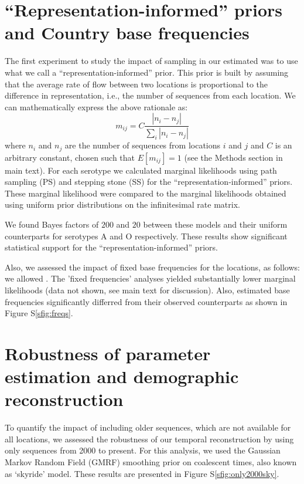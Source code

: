 \documentclass[a4paper,10pt]{article}
\begin{document}
\section{``Representation-informed'' priors and Country base frequencies}
The first experiment to study the impact of sampling in our estimated was to use what we call a ``representation-informed'' prior.
This prior is built by assuming that the average rate of flow between two locations is proportional to the difference in representation, i.e., the number of sequences from each location.
We can mathematically express the above rationale as:
\begin{equation}
 m_{ij}=C\frac{|n_i-n_j|}{\sum_i|n_i-n_j|}
\end{equation}
where $n_i$ and $n_j$ are the number of sequences from locations $i$ and $j$ and $C$ is an arbitrary constant, chosen such that $E[m_{ij}]=1$ (see the Methods section in main text).
For each serotype we calculated marginal likelihoods using path sampling (PS) and stepping stone (SS) for the ``representation-informed'' priors.
These marginal likelihood were compared to the marginal likelihoods obtained using uniform prior distributions on the infinitesimal rate matrix.

We found Bayes factors of $200$ and $20$ between these models and their uniform counterparts for serotypes A and O respectively.
These results show significant statistical support for the ``representation-informed'' priors.

Also, we assessed the impact of fixed base frequencies for the locations, as follows: we allowed .
The 'fixed frequencies' analyses yielded substantially lower marginal likelihoods (data not shown, see main text for discussion).
Also, estimated base frequencies significantly differred from their observed counterparts as shown in Figure S\ref{sfig:freqs}.

\section{Robustness of parameter estimation and demographic reconstruction}

To quantify the impact of including older sequences, which are not available for all locations, we assessed the robustness of our temporal reconstruction by using only sequences from 2000 to present.
For this analysis, we used the Gaussian Markov Random Field (GMRF) smoothing prior on coalescent times, also known as `skyride' model.
These results are presented in Figure S\ref{sfig:only2000sky}.
\end{document}
